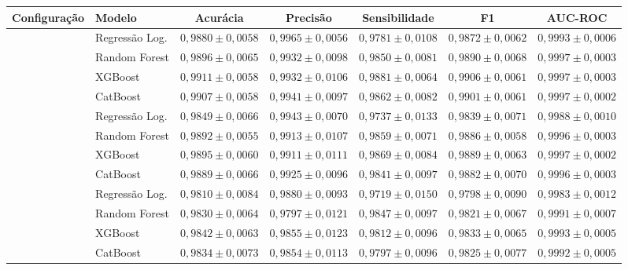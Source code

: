\documentclass[msc]{on} %
\begin{document}
\begin{table}[htbp]
{\begin{tabular}{llccccc}
\hline
\textbf{Configuração} & \textbf{Modelo} & \textbf{Acurácia} & \textbf{Precisão} & \textbf{Sensibilidade} & \textbf{F1} & \textbf{AUC-ROC} \\
\hline
{} & Regressão Log. & $0{,}9880 \pm 0{,}0058$ & $0{,}9965 \pm 0{,}0056$ & $0{,}9781 \pm 0{,}0108$ & $0{,}9872 \pm 0{,}0062$ & $0{,}9993 \pm 0{,}0006$ \\
 & Random Forest & $0{,}9896 \pm 0{,}0065$ & $0{,}9932 \pm 0{,}0098$ & $0{,}9850 \pm 0{,}0081$ & $0{,}9890 \pm 0{,}0068$ & $0{,}9997 \pm 0{,}0003$ \\
 & XGBoost & $0{,}9911 \pm 0{,}0058$ & $0{,}9932 \pm 0{,}0106$ & $0{,}9881 \pm 0{,}0064$ & $0{,}9906 \pm 0{,}0061$ & $0{,}9997 \pm 0{,}0003$ \\
 & CatBoost & $0{,}9907 \pm 0{,}0058$ & $0{,}9941 \pm 0{,}0097$ & $0{,}9862 \pm 0{,}0082$ & $0{,}9901 \pm 0{,}0061$ & $0{,}9997 \pm 0{,}0002$ \\
\hline
{} & Regressão Log. & $0{,}9849 \pm 0{,}0066$ & $0{,}9943 \pm 0{,}0070$ & $0{,}9737 \pm 0{,}0133$ & $0{,}9839 \pm 0{,}0071$ & $0{,}9988 \pm 0{,}0010$ \\
 & Random Forest & $0{,}9892 \pm 0{,}0055$ & $0{,}9913 \pm 0{,}0107$ & $0{,}9859 \pm 0{,}0071$ & $0{,}9886 \pm 0{,}0058$ & $0{,}9996 \pm 0{,}0003$ \\
 & XGBoost & $0{,}9895 \pm 0{,}0060$ & $0{,}9911 \pm 0{,}0111$ & $0{,}9869 \pm 0{,}0084$ & $0{,}9889 \pm 0{,}0063$ & $0{,}9997 \pm 0{,}0002$ \\
 & CatBoost & $0{,}9889 \pm 0{,}0066$ & $0{,}9925 \pm 0{,}0096$ & $0{,}9841 \pm 0{,}0097$ & $0{,}9882 \pm 0{,}0070$ & $0{,}9996 \pm 0{,}0003$ \\
\hline
{} & Regressão Log. & $0{,}9810 \pm 0{,}0084$ & $0{,}9880 \pm 0{,}0093$ & $0{,}9719 \pm 0{,}0150$ & $0{,}9798 \pm 0{,}0090$ & $0{,}9983 \pm 0{,}0012$ \\
 & Random Forest & $0{,}9830 \pm 0{,}0064$ & $0{,}9797 \pm 0{,}0121$ & $0{,}9847 \pm 0{,}0097$ & $0{,}9821 \pm 0{,}0067$ & $0{,}9991 \pm 0{,}0007$ \\
 & XGBoost & $0{,}9842 \pm 0{,}0063$ & $0{,}9855 \pm 0{,}0123$ & $0{,}9812 \pm 0{,}0096$ & $0{,}9833 \pm 0{,}0065$ & $0{,}9993 \pm 0{,}0005$ \\
 & CatBoost & $0{,}9834 \pm 0{,}0073$ & $0{,}9854 \pm 0{,}0113$ & $0{,}9797 \pm 0{,}0096$ & $0{,}9825 \pm 0{,}0077$ & $0{,}9992 \pm 0{,}0005$ \\

\end{tabular}}
\end{table}
\end{document}
